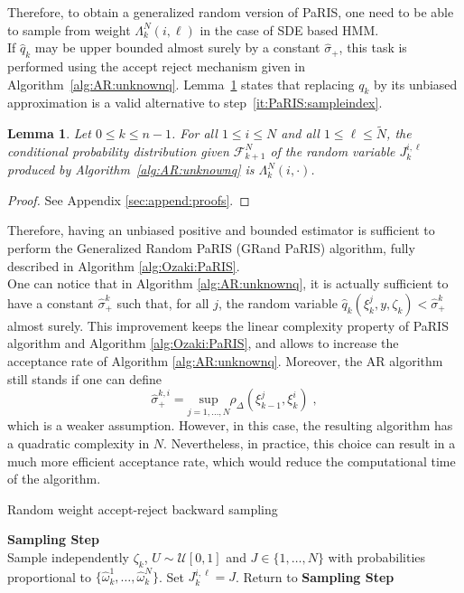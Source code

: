 \documentclass[12pt,draft]{article}
\newcommand{\eqsp}{\;}
\newcommand{\1}{\mathrm{1}}
\newcommand{\qk}{q_{k}}
\newtheorem{lemma}{Lemma}
\begin{document}
Therefore, to obtain a generalized random version of PaRIS, one need to be able to sample from weight $\Lambda_k^N(i,\ell)$ in the case of SDE based HMM.\\
If $\widehat{q}_k$ may be upper bounded almost surely by a constant $\hat{\sigma}_+$, this task is performed using the accept reject mechanism given in Algorithm~\ref{alg:AR:unknownq}. Lemma~\ref{lem:AR:unbiased} states that replacing  $\qk$ by its unbiased approximation is a valid alternative to step~\eqref{it:PaRIS:sampleindex}.\\
\begin{lemma}
\label{lem:AR:unbiased}
Let $0\le k\le n-1$.  For all $1\le i \le N$ and all $1\le \ell \le \widetilde{N}$, the conditional probability distribution given $\mathcal{F}_{k+1}^N$ of the random variable $J_{k}^{i,\ell}$ produced by Algorithm~\ref{alg:AR:unknownq} is  $\Lambda_{k}^N(i,\cdot)$. 
\end{lemma}
\begin{proof}
See Appendix \ref{sec:append:proofs}.
\end{proof}
Therefore, having an unbiased positive and bounded estimator is sufficient to perform the Generalized Random PaRIS (GRand PaRIS) algorithm, fully described in Algorithm \ref{alg:Ozaki:PaRIS}.\\
One can notice that in Algorithm \ref{alg:AR:unknownq}, it is actually sufficient to have a constant $\hat{\sigma}_+^k$ such that, for all $j$, the random variable $\hat{q}_k(\xi_k^j,y,\zeta_k)< \hat{\sigma}_+^k$ almost surely. This improvement keeps the linear complexity property of PaRIS algorithm and Algorithm \ref{alg:Ozaki:PaRIS}, and allows to increase the acceptance rate of Algorithm \ref{alg:AR:unknownq}. Moreover, the AR algorithm still stands if one can define 
\begin{equation}
\hat{\sigma}_{+}^{k,i}= \underset{j=1,\dots,N}{\text{sup}}\rho_\Delta(\xi_{k-1}^j,\xi_k^i)\eqsp, \label{eq:quadr:bound}
\end{equation}
which is a weaker assumption. However, in this case, the resulting algorithm has a quadratic complexity in $N$. Nevertheless, in practice, this choice can result in a much more efficient acceptance rate, which would reduce the computational time of the algorithm. 
\begin{algorithm}[H]
\caption{Random weight accept-reject backward sampling}
\begin{algorithmic}
\STATE \textbf{\sc Sampling Step} \\
Sample independently $
\zeta_k$, $U\sim \mathcal{U}[0,1]$ and $J\in\{1,\ldots,N\}$ with probabilities proportional to $\{\widehat{\omega}_{k}^1,\dots,\widehat{\omega}_{k}^N\}$.
\IF{ $$U \leq \frac{\widehat{\qk}(\xi_{k}^J,\xi_{k+1}^i,\zeta_k)}{\hat{\sigma}_+},$$}
\STATE Set $J_k^{i,\ell} = J$.
\ELSE 
\STATE Return to \textbf{\sc Sampling Step}
\ENDIF
\ENDFOR
\ENDFOR
\end{algorithmic}
\label{alg:AR:unknownq}
\end{algorithm}
\end{document}
